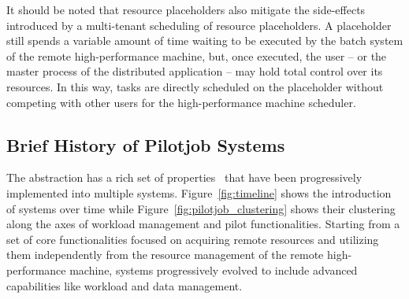 \documentclass{sig-alternate}
\begin{document}
It should be noted that resource placeholders also mitigate the side-effects
introduced by a multi-tenant scheduling of resource placeholders. A placeholder
still spends a variable amount of time waiting to be executed by the batch
system of the remote high-performance machine, but, once executed, the user --
or the master process of the distributed application -- may hold total control
over its resources. In this way, tasks are directly scheduled on the placeholder
without competing with other users for the high-performance machine scheduler.


\subsection{Brief History of Pilotjob Systems}
\label{sec:histimpl}

The \pilot abstraction has a rich set of properties~\cite{luckow2012towards}
that have been progressively implemented into multiple \pilotjob systems.
Figure~\ref{fig:timeline} shows the introduction of \pilotjob systems over time
while Figure~\ref{fig:pilotjob_clustering} shows their clustering along the axes
of workload management and pilot functionalities. Starting from a set of core
functionalities focused on acquiring remote resources and utilizing them
independently from the resource management of the remote high-performance
machine, \pilotjob systems progressively evolved to include advanced
capabilities like workload and data management.

\end{document}
